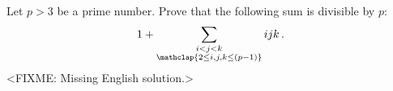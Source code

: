 \problem{}
Let $p > 3$ be a prime number.
Prove that the following sum is divisible by $p$:
\[
    1 +
    \sum_{\substack{
        i < j < k \\
        \mathclap{2 \leq i, j, k \leq (p - 1)}
    }}
        i j k
\, . \]
\solution
<FIXME: Missing English solution.>
\endproblem
